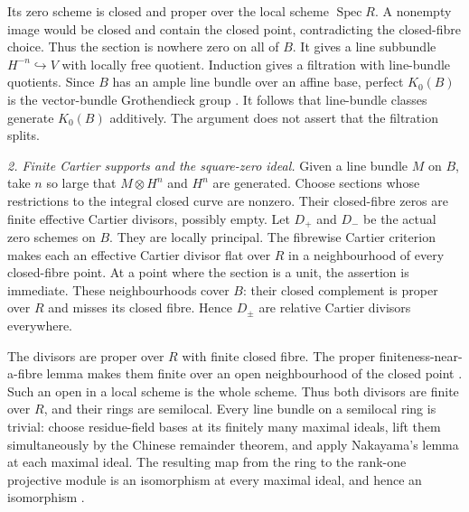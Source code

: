 Its zero scheme is closed and proper over the local scheme
$\operatorname{Spec}R$.  A nonempty image would be closed and
contain the closed point, contradicting the closed-fibre choice.
Thus the section is nowhere zero on all of $B$.  It gives a line
subbundle $H^{-n}\hookrightarrow V$ with locally free quotient.
Induction gives a filtration with line-bundle quotients.  Since $B$
has an ample line bundle over an affine base, perfect $K_0(B)$ is
the vector-bundle Grothendieck group
\citep[Corollary 3.9 and Proposition 3.10]{D_ThomasonTrobaugh1990}.
It follows that line-bundle classes generate $K_0(B)$ additively.
The argument does not assert that the filtration splits.

\emph{2. Finite Cartier supports and the square-zero ideal.}
Given a line bundle $M$ on $B$, take $n$ so large that
$M\otimes H^n$ and $H^n$ are generated.  Choose sections whose
restrictions to the integral closed curve are nonzero.  Their
closed-fibre zeros are finite effective Cartier divisors, possibly
empty.  Let $D_+$ and $D_-$ be the actual zero schemes on $B$.
They are locally principal.  The fibrewise Cartier criterion
\citep[Lemma 31.19.9(3)]{frNKStacksRelativeCartier} makes each
an effective Cartier divisor flat over $R$ in a neighbourhood of
every closed-fibre point.  At a point where the section is a unit,
the assertion is immediate.  These neighbourhoods cover $B$:
their closed complement is proper over $R$ and misses its closed
fibre.  Hence $D_\pm$ are relative Cartier divisors everywhere.

The divisors are proper over $R$ with finite closed fibre.
The proper finiteness-near-a-fibre lemma makes them finite over
an open neighbourhood of the closed point
\citep[Lemma 37.44.2, using Lemma 37.44.1]
{frNKStacksFiniteNearFibre,frNKStacksProperFinite}.
Such an open in a local scheme is the whole scheme.  Thus both
divisors are finite over $R$, and their rings are semilocal.
Every line bundle on a semilocal ring is trivial: choose residue-field
bases at its finitely many maximal ideals, lift them simultaneously
by the Chinese remainder theorem, and apply Nakayama's lemma at
each maximal ideal.  The resulting map from the ring to the
rank-one projective module is an isomorphism at every maximal ideal,
and hence an isomorphism
\citep[Lemma 10.78.7 and printed hints]{frWPStacksSemilocal}.


